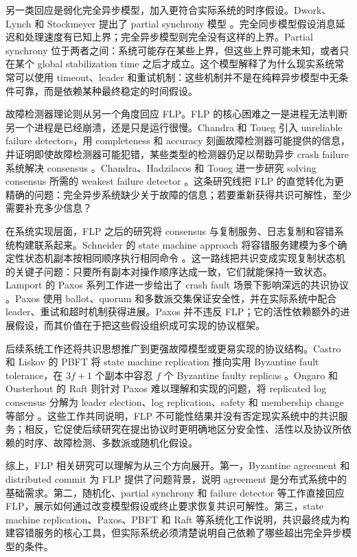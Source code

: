 另一类回应是弱化完全异步模型，加入更符合实际系统的时序假设。Dwork、Lynch 和 Stockmeyer 提出了 partial synchrony 模型 \cite{dwork1988consensus}。完全同步模型假设消息延迟和处理速度有已知上界；完全异步模型则完全没有这样的上界。Partial synchrony 位于两者之间：系统可能存在某些上界，但这些上界可能未知，或者只在某个 global stabilization time 之后才成立。这个模型解释了为什么现实系统常常可以使用 timeout、leader 和重试机制：这些机制并不是在纯粹异步模型中无条件可靠，而是依赖某种最终稳定的时间假设。

故障检测器理论则从另一个角度回应 FLP。FLP 的核心困难之一是进程无法判断另一个进程是已经崩溃，还是只是运行很慢。Chandra 和 Toueg 引入 unreliable failure detectors，用 completeness 和 accuracy 刻画故障检测器可能提供的信息，并证明即使故障检测器可能犯错，某些类型的检测器仍足以帮助异步 crash failure 系统解决 consensus \cite{chandra1996unreliable}。Chandra、Hadzilacos 和 Toueg 进一步研究 solving consensus 所需的 weakest failure detector \cite{chandra1996weakest}。这条研究线把 FLP 的直觉转化为更精确的问题：完全异步系统缺少关于故障的信息；若要重新获得共识可解性，至少需要补充多少信息？

在系统实现层面，FLP 之后的研究将 consensus 与复制服务、日志复制和容错系统构建联系起来。Schneider 的 state machine approach 将容错服务建模为多个确定性状态机副本按相同顺序执行相同命令 \cite{schneider1990state}。这一路线把共识变成实现复制状态机的关键子问题：只要所有副本对操作顺序达成一致，它们就能保持一致状态。Lamport 的 Paxos 系列工作进一步给出了 crash fault 场景下影响深远的共识协议 \cite{lamport1998part,lamport2001paxos}。Paxos 使用 ballot、quorum 和多数派交集保证安全性，并在实际系统中配合 leader、重试和超时机制获得进展。Paxos 并不违反 FLP；它的活性依赖额外的进展假设，而其价值在于把这些假设组织成可实现的协议框架。

后续系统工作还将共识思想推广到更强故障模型或更易实现的协议结构。Castro 和 Liskov 的 PBFT 将 state machine replication 推向实用 Byzantine fault tolerance，在 $3f+1$ 个副本中容忍 $f$ 个 Byzantine faulty replicas \cite{castro1999practical}。Ongaro 和 Ousterhout 的 Raft 则针对 Paxos 难以理解和实现的问题，将 replicated log consensus 分解为 leader election、log replication、safety 和 membership change 等部分 \cite{ongaro2014search}。这些工作共同说明，FLP 不可能性结果并没有否定现实系统中的共识服务；相反，它促使后续研究在提出协议时更明确地区分安全性、活性以及协议所依赖的时序、故障检测、多数派或随机化假设。

综上，FLP 相关研究可以理解为从三个方向展开。第一，Byzantine agreement 和 distributed commit 为 FLP 提供了问题背景，说明 agreement 是分布式系统中的基础需求。第二，随机化、partial synchrony 和 failure detector 等工作直接回应 FLP，展示如何通过改变模型假设或终止要求恢复共识可解性。第三，state machine replication、Paxos、PBFT 和 Raft 等系统化工作说明，共识最终成为构建容错服务的核心工具，但实际系统必须清楚说明自己依赖了哪些超出完全异步模型的条件。
